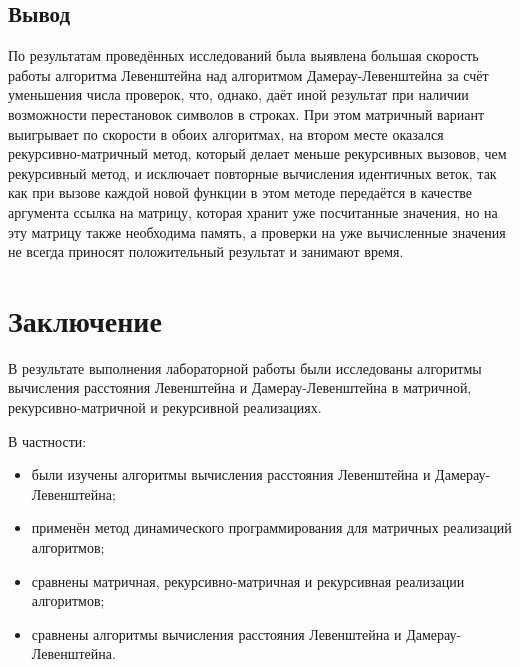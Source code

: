 \documentclass[a4paper,12pt]{article}
\begin{document}
\subsection*{Вывод}
По результатам проведённых исследований была выявлена большая скорость работы алгоритма Левенштейна над алгоритмом Дамерау-Левенштейна за счёт уменьшения числа проверок, что, однако, даёт иной результат при наличии возможности перестановок символов в строках. При этом матричный вариант выигрывает по скорости в обоих алгоритмах, на втором месте оказался рекурсивно-матричный метод, который делает меньше рекурсивных вызовов, чем рекурсивный метод, и исключает повторные вычисления идентичных веток, так как при вызове каждой новой функции в этом методе передаётся в качестве аргумента ссылка на матрицу, которая хранит уже посчитанные значения, но на эту матрицу также необходима память, а проверки на уже вычисленные значения не всегда приносят положительный результат и занимают время.
\newpage

\section*{Заключение}
В результате выполнения лабораторной работы были исследованы алгоритмы вычисления расстояния Левенштейна и Дамерау-Левенштейна в матричной, рекурсивно-матричной и рекурсивной реализациях.\par
В частности:\par
\begin{itemize}
\item были изучены алгоритмы вычисления расстояния Левенштейна и Дамерау-Левенштейна;
\item применён метод динамического программирования для матричных реализаций алгоритмов;
\item сравнены матричная, рекурсивно-матричная и рекурсивная реализации алгоритмов;
\item сравнены алгоритмы вычисления расстояния Левенштейна и Дамерау-Левенштейна.
\end{itemize}

\newpage
\end{document}
